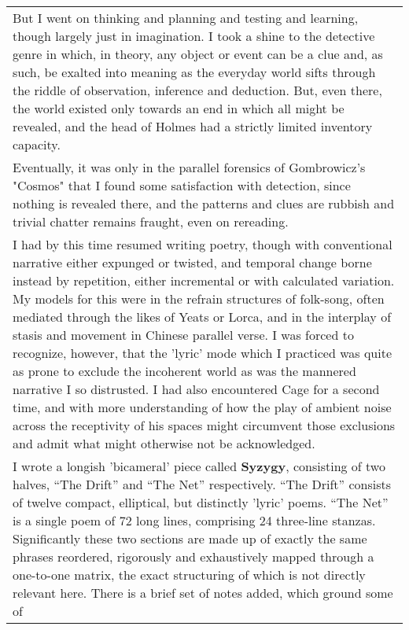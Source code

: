 \begin{longtable}[]{@{}l@{}}
\begin{minipage}[t]{0.97\columnwidth}\raggedright
But I went on thinking and planning and testing and learning, though
largely just in imagination. I took a shine to the detective genre in
which, in theory, any object or event can be a clue and, as such, be
exalted into meaning as the everyday world sifts through the riddle of
observation, inference and deduction. But, even there, the world existed
only towards an end in which all might be revealed, and the head of
Holmes had a strictly limited inventory capacity.\strut
\end{minipage}\tabularnewline
\begin{minipage}[t]{0.97\columnwidth}\raggedright
Eventually, it was only in the parallel forensics of Gombrowicz's
"Cosmos" that I found some satisfaction with detection, since nothing is
revealed there, and the patterns and clues are rubbish and trivial
chatter remains fraught, even on rereading.\strut
\end{minipage}\tabularnewline
\begin{minipage}[t]{0.97\columnwidth}\raggedright
I had by this time resumed writing poetry, though with conventional
narrative either expunged or twisted, and temporal change borne instead
by repetition, either incremental or with calculated variation. My
models for this were in the refrain structures of folk-song, often
mediated through the likes of Yeats or Lorca, and in the interplay of
stasis and movement in Chinese parallel verse. I was forced to
recognize, however, that the 'lyric' mode which I practiced was quite as
prone to exclude the incoherent world as was the mannered narrative I so
distrusted. I had also encountered Cage for a second time, and with more
understanding of how the play of ambient noise across the receptivity of
his spaces might circumvent those exclusions and admit what might
otherwise not be acknowledged.\strut
\end{minipage}\tabularnewline
\begin{minipage}[t]{0.97\columnwidth}\raggedright
I wrote a longish 'bicameral' piece called \textbf{Syzygy}, consisting
of two halves, ``The Drift'' and ``The Net'' respectively. ``The Drift''
consists of twelve compact, elliptical, but distinctly 'lyric' poems.
``The Net'' is a single poem of 72 long lines, comprising 24 three-line
stanzas. Significantly these two sections are made up of exactly the
same phrases reordered, rigorously and exhaustively mapped through a
one-to-one matrix, the exact structuring of which is not directly
relevant here. There is a brief set of notes added, which ground some of

\end{minipage}
\end{longtable}
